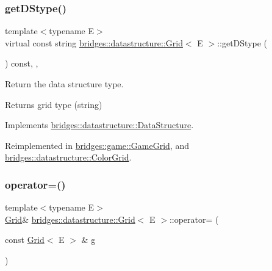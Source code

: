\subsubsection{\texorpdfstring{get\+D\+Stype()}{getDStype()}}
{\footnotesize\ttfamily template$<$typename E$>$ \\
virtual const string \hyperlink{classbridges_1_1datastructure_1_1_grid}{bridges\+::datastructure\+::\+Grid}$<$ E $>$\+::get\+D\+Stype (\begin{DoxyParamCaption}{ }\end{DoxyParamCaption}) const\hspace{0.3cm}{\ttfamily [inline]}, {\ttfamily [override]}, {\ttfamily [virtual]}}



Return the data structure type. 

\begin{DoxyReturn}{Returns}
grid type (string) 
\end{DoxyReturn}


Implements \hyperlink{classbridges_1_1datastructure_1_1_data_structure_a4ff66cb34409f11fe9fc647f6d8a22ce}{bridges\+::datastructure\+::\+Data\+Structure}.



Reimplemented in \hyperlink{classbridges_1_1game_1_1_game_grid_a07da19700a077e3d0f2cde2cade2ba60}{bridges\+::game\+::\+Game\+Grid}, and \hyperlink{classbridges_1_1datastructure_1_1_color_grid_afad945d648b427ca183a1dface8249b7}{bridges\+::datastructure\+::\+Color\+Grid}.

\mbox{\label{classbridges_1_1datastructure_1_1_grid_a3522d8c94ad390ebafb12257a6c9b82f}} 
\subsubsection{\texorpdfstring{operator=()}{operator=()}}
{\footnotesize\ttfamily template$<$typename E$>$ \\
\hyperlink{classbridges_1_1datastructure_1_1_grid}{Grid}\& \hyperlink{classbridges_1_1datastructure_1_1_grid}{bridges\+::datastructure\+::\+Grid}$<$ E $>$\+::operator= (\begin{DoxyParamCaption}\item[{const \hyperlink{classbridges_1_1datastructure_1_1_grid}{Grid}$<$ E $>$ \&}]{g }\end{DoxyParamCaption})\hspace{0.3cm}{\ttfamily [inline]}}


